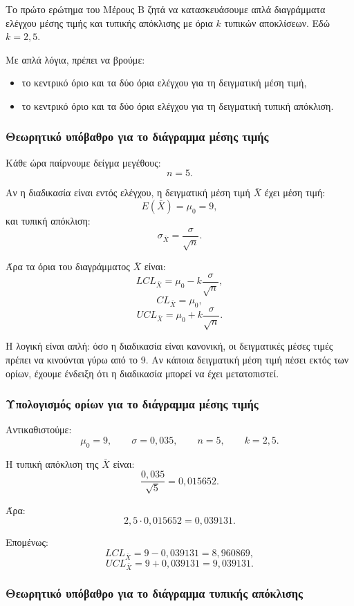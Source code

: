 \documentclass[12pt,a4paper]{article}
\begin{document}
Το πρώτο ερώτημα του Μέρους Β ζητά να κατασκευάσουμε απλά διαγράμματα ελέγχου
μέσης τιμής και τυπικής απόκλισης με όρια \(k\) τυπικών αποκλίσεων. Εδώ
\(k=2{,}5\).

Με απλά λόγια, πρέπει να βρούμε:

\begin{itemize}
    \item το κεντρικό όριο και τα δύο όρια ελέγχου για τη δειγματική μέση τιμή,
    \item το κεντρικό όριο και τα δύο όρια ελέγχου για τη δειγματική τυπική
    απόκλιση.
\end{itemize}

\subsubsection*{Θεωρητικό υπόβαθρο για το διάγραμμα μέσης τιμής}

Κάθε ώρα παίρνουμε δείγμα μεγέθους:
\[
    n=5.
\]

Αν η διαδικασία είναι εντός ελέγχου, η δειγματική μέση τιμή \(\bar X\) έχει
μέση τιμή:
\[
    E(\bar X)=\mu_0=9,
\]
και τυπική απόκλιση:
\[
    \sigma_{\bar X}=\frac{\sigma}{\sqrt{n}}.
\]

Άρα τα όρια του διαγράμματος \(\bar X\) είναι:
\[
    LCL_{\bar X}=\mu_0-k\frac{\sigma}{\sqrt n},
\]
\[
    CL_{\bar X}=\mu_0,
\]
\[
    UCL_{\bar X}=\mu_0+k\frac{\sigma}{\sqrt n}.
\]

Η λογική είναι απλή: όσο η διαδικασία είναι κανονική, οι δειγματικές μέσες
τιμές πρέπει να κινούνται γύρω από το 9. Αν κάποια δειγματική μέση τιμή πέσει
εκτός των ορίων, έχουμε ένδειξη ότι η διαδικασία μπορεί να έχει μετατοπιστεί.

\subsubsection*{Υπολογισμός ορίων για το διάγραμμα μέσης τιμής}

Αντικαθιστούμε:
\[
    \mu_0=9,\qquad \sigma=0{,}035,\qquad n=5,\qquad k=2{,}5.
\]

Η τυπική απόκλιση της \(\bar X\) είναι:
\[
    \frac{0{,}035}{\sqrt 5}=0{,}015652.
\]

Άρα:
\[
    2{,}5\cdot 0{,}015652=0{,}039131.
\]

Επομένως:
\[
    LCL_{\bar X}=9-0{,}039131=8{,}960869,
\]
\[
    UCL_{\bar X}=9+0{,}039131=9{,}039131.
\]

\subsubsection*{Θεωρητικό υπόβαθρο για το διάγραμμα τυπικής απόκλισης}
\end{document}
